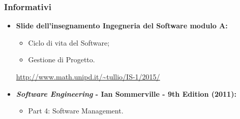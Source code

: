 \subsubsection{Informativi}
\begin{itemize}
	\item \textbf{Slide dell'insegnamento Ingegneria del Software modulo A:}
	\begin{itemize}
		\item Ciclo di vita del Software;
		\item Gestione di Progetto.
	\end{itemize}
	\url{http://www.math.unipd.it/~tullio/IS-1/2015/}
	\item \textbf{\textit{Software Engineering} - Ian Sommerville - 9th Edition (2011):}
	\begin{itemize}
		\item Part 4: Software Management.
	\end{itemize} 
\end{itemize}